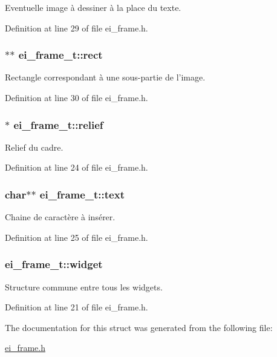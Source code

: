 Eventuelle image à dessiner à la place du texte. 



Definition at line 29 of file ei\-\_\-frame.\-h.

\hypertarget{structei__frame__t_a0825a838e0405ceb5f24bb43cb105113}{
\subsubsection[{rect}]{$\ast$$\ast$ ei\-\_\-frame\-\_\-t\-::rect}}\label{structei__frame__t_a0825a838e0405ceb5f24bb43cb105113}


Rectangle correspondant à une sous-\/partie de l'image. 



Definition at line 30 of file ei\-\_\-frame.\-h.

\hypertarget{structei__frame__t_ae547648681fd8fdf017041d60387ab3d}{
\subsubsection[{relief}]{$\ast$ ei\-\_\-frame\-\_\-t\-::relief}}\label{structei__frame__t_ae547648681fd8fdf017041d60387ab3d}


Relief du cadre. 



Definition at line 24 of file ei\-\_\-frame.\-h.

\hypertarget{structei__frame__t_a17c0d110f2f3fe98e566d7ac3769786b}{
\subsubsection[{text}]{\setlength{\rightskip}{0pt plus 5cm}char$\ast$$\ast$ ei\-\_\-frame\-\_\-t\-::text}}\label{structei__frame__t_a17c0d110f2f3fe98e566d7ac3769786b}


Chaine de caractère à insérer. 



Definition at line 25 of file ei\-\_\-frame.\-h.

\hypertarget{structei__frame__t_a712db0711a6f2da5e96df73f562572b6}{
\subsubsection[{widget}]{ ei\-\_\-frame\-\_\-t\-::widget}}\label{structei__frame__t_a712db0711a6f2da5e96df73f562572b6}


Structure commune entre tous les widgets. 



Definition at line 21 of file ei\-\_\-frame.\-h.



The documentation for this struct was generated from the following file\-:\begin{DoxyCompactItemize}
\item 
\hyperlink{ei__frame_8h}{ei\-\_\-frame.\-h}\end{DoxyCompactItemize}
